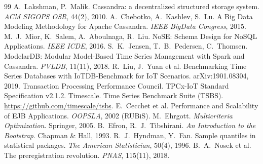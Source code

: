 \documentclass[10pt,a4paper,twoside]{article}
\theoremstyle{definition}\newtheorem{definicao}{Definição}
\begin{document}
\begin{thebibliography}{99}\small
{} A.~Lakshman, P.~Malik. Cassandra: a decentralized structured storage system. \emph{ACM SIGOPS OSR}, 44(2), 2010.
 A.~Chebotko, A.~Kashlev, S.~Lu. A Big Data Modeling Methodology for Apache Cassandra. \emph{IEEE BigData Congress}, 2015.
 M.~J.~Mior, K.~Salem, A.~Aboulnaga, R.~Liu. NoSE: Schema Design for NoSQL Applications. \emph{IEEE ICDE}, 2016.
 S.~K.~Jensen, T.~B.~Pedersen, C.~Thomsen. ModelarDB: Modular Model-Based Time Series Management with Spark and Cassandra. \emph{PVLDB}, 11(11), 2018.
 R.~Liu, J.~Yuan et al. Benchmarking Time Series Databases with IoTDB-Benchmark for IoT Scenarios. arXiv:1901.08304, 2019.
 Transaction Processing Performance Council. TPCx-IoT Standard Specification v2.1.2.
 Timescale. Time Series Benchmark Suite (TSBS). \url{https://github.com/timescale/tsbs}.
 E.~Cecchet et al. Performance and Scalability of EJB Applications. \emph{OOPSLA}, 2002 (RUBiS).
 M.~Ehrgott. \emph{Multicriteria Optimization}. Springer, 2005.
 B.~Efron, R.~J.~Tibshirani. \emph{An Introduction to the Bootstrap}. Chapman \& Hall, 1993.
 R.~J.~Hyndman, Y.~Fan. Sample quantiles in statistical packages. \emph{The American Statistician}, 50(4), 1996.
 B.~A.~Nosek et al. The preregistration revolution. \emph{PNAS}, 115(11), 2018.
\end{thebibliography}
\end{document}
